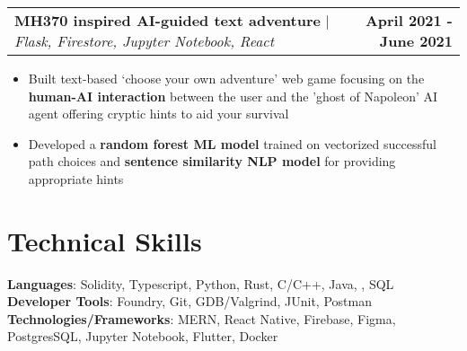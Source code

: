 \documentclass[letterpaper,11pt]{article}
\makeatletter
\newcommand{\resumeItem}[1]{
  \item\small{
    {#1 \vspace{-2pt}}
  }
}
\newcommand{\resumeProjectHeading}[2]{
    \item
    \begin{tabular*}{1.001\textwidth}{l@{\extracolsep{\fill}}r}
      \small#1 & \textbf{\small #2}\\
    \end{tabular*}\vspace{-7pt}
}
\newcommand{\resumeSubHeadingListEnd}{\end{itemize}}
\newcommand{\resumeItemListStart}{\begin{itemize}}
\newcommand{\resumeItemListEnd}{\end{itemize}\vspace{-5pt}}
\makeatother
\begin{document}
      \resumeProjectHeading
          {\textbf{MH370 inspired AI-guided text adventure} $|$ \emph{Flask, Firestore, Jupyter Notebook,  React}}{April  2021 - June 2021}
          \resumeItemListStart
            \resumeItem{Built text-based \lq choose your own adventure\rq{ }web game focusing on the \textbf{human-AI interaction} between the user and the 'ghost of Napoleon' AI agent offering cryptic hints to aid your survival}
             \resumeItem{Developed a \textbf{random forest ML model} trained on vectorized successful path choices and \textbf{sentence similarity NLP model} for providing appropriate hints}
          \resumeItemListEnd
          \vspace{-13pt}



\vspace{5pt}


%
\section{Technical Skills}
 \begin{itemize}[leftmargin=0.15in, label={}]
    \small{\item{
     \textbf{Languages}{: Solidity, Typescript, Python, Rust, C/C++, Java, , SQL} \\
     \textbf{Developer Tools}{: Foundry, Git,  GDB/Valgrind, JUnit, Postman} \\
     \textbf{Technologies/Frameworks}{: MERN, React Native, Firebase,  Figma, PostgresSQL, Jupyter Notebook, Flutter, Docker} \\
    }}
 \end{itemize}
 \vspace{-16pt}
\end{document}
